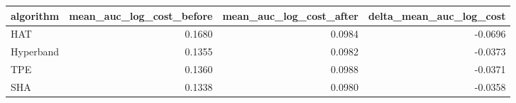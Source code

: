 \begin{tabular}{lrrr}
\toprule
algorithm & mean_auc_log_cost_before & mean_auc_log_cost_after & delta_mean_auc_log_cost \\
\midrule
HAT & 0.1680 & 0.0984 & -0.0696 \\
Hyperband & 0.1355 & 0.0982 & -0.0373 \\
TPE & 0.1360 & 0.0988 & -0.0371 \\
SHA & 0.1338 & 0.0980 & -0.0358 \\
\bottomrule
\end{tabular}
